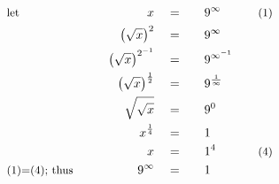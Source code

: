 \begin{alignat*}{7}
&\small\text{let}&x\quad&=\quad&&9^\infty\qquad&&\small\text{(1)}\\
&\,&\left(\sqrt{x}\right)^2\quad&=&&9^\infty\\
&\,&\left(\sqrt{x}\right)^{2^{-1}}\quad&=&&9^{\infty^{-1}}\\
&\,&\left(\sqrt{x}\right)^{\frac{1}{2}}\quad&=&&9^{\frac{1}{\infty}}\\
&\,&\sqrt{\sqrt{x}}\quad&=&&9^0\\
&\,&x^{\frac{1}{4}}\quad&=&&1\\
&\,&x\quad&=&&1^4&&\small\text{(4)}\\
&\small\text{(1)=(4); thus}\qquad&9^\infty\quad&=&&1
\end{alignat*}
